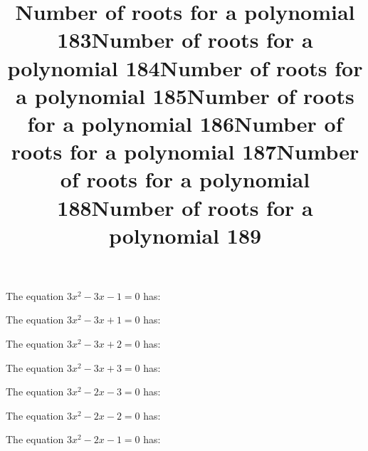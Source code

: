 \documentclass{article}
\begin{document}
\begin{category}
\begin{question}[multichoice]
\end{question}
\begin{question}[multichoice]
\title{Number of roots for a polynomial 183}
The equation $3 x^{2} - 3 x - 1=0$ has:



\end{question}
\begin{question}[multichoice]
\title{Number of roots for a polynomial 184}
The equation $3 x^{2} - 3 x + 1=0$ has:



\end{question}
\begin{question}[multichoice]
\title{Number of roots for a polynomial 185}
The equation $3 x^{2} - 3 x + 2=0$ has:



\end{question}
\begin{question}[multichoice]
\title{Number of roots for a polynomial 186}
The equation $3 x^{2} - 3 x + 3=0$ has:



\end{question}
\begin{question}[multichoice]
\title{Number of roots for a polynomial 187}
The equation $3 x^{2} - 2 x - 3=0$ has:



\end{question}
\begin{question}[multichoice]
\title{Number of roots for a polynomial 188}
The equation $3 x^{2} - 2 x - 2=0$ has:



\end{question}
\begin{question}[multichoice]
\title{Number of roots for a polynomial 189}
The equation $3 x^{2} - 2 x - 1=0$ has:


\end{question}
\end{category}
\end{document}
